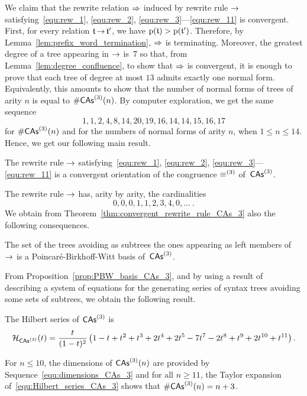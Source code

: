 \noindent
We claim that the rewrite relation $\operatorname{\Rightarrow}$ induced by
rewrite rule $\operatorname{\to}$ satisfying~\eqref{equ:rew_1}, \eqref{equ:rew_2},
\eqref{equ:rew_3}---\eqref{equ:rew_11} is convergent. First, for every
relation $\mathfrak{t} \operatorname{\to} \mathfrak{t}'$, we have
$\mathrm{p}(\mathfrak{t}) > \mathrm{p}(\mathfrak{t}')$. Therefore, by
Lemma~\ref{lem:prefix_word_termination}, $\operatorname{\Rightarrow}$ is terminating.
Moreover, the greatest degree of a tree appearing in $\operatorname{\to}$ is~$7$ so
that, from Lemma~\ref{lem:degree_confluence}, to show that $\operatorname{\Rightarrow}$
is convergent, it is enough to prove that each tree of degree at most
$13$ admits exactly one normal form. Equivalently, this amounts to
show that the number of normal forms of trees of arity $n$ is equal
to $\#\mathsf{CAs}^{(3)}(n)$. By computer exploration, we get the same sequence
\begin{equation} \label{equ:dimensions_CAs_3}
    1, 1, 2, 4, 8, 14, 20, 19, 16, 14, 14, 15, 16, 17
\end{equation}
for $\#\mathsf{CAs}^{(3)}(n)$ and for the numbers of normal forms of arity $n$,
when $ 1 \leq n \leq 14$. Hence, we get our following main result.
\medbreak

\begin{Theorem} \label{thm:convergent_rewrite_rule_CAs_3}
    The rewrite rule $\operatorname{\to}$ satisfying~\eqref{equ:rew_1},
    \eqref{equ:rew_2}, \eqref{equ:rew_3}---\eqref{equ:rew_11} is a
    convergent orientation of the congruence $\operatorname{\equiv}^{(3)}$
    of~$\mathsf{CAs}^{(3)}$.
\end{Theorem}
\medbreak

The rewrite rule $\operatorname{\to}$ has, arity by arity, the cardinalities
\begin{equation}
    0, 0, 0, 1, 1, 2, 3, 4, 0, \dots~.
\end{equation}
We obtain from Theorem~\ref{thm:convergent_rewrite_rule_CAs_3} also
the following consequences.
\medbreak

\begin{Proposition} \label{prop:PBW_basis_CAs_3}
    The set of the trees avoiding as subtrees the ones appearing as
    left members of $\operatorname{\to}$ is a Poincaré-Birkhoff-Witt basis
    of~$\mathsf{CAs}^{(3)}$.
\end{Proposition}
\medbreak

From Proposition~\ref{prop:PBW_basis_CAs_3}, and by using a result
of~\cite{Gir18} describing a system of equations for the generating
series of syntax trees avoiding some sets of subtrees, we obtain the
following result.
\medbreak

\begin{Proposition} \label{prop:Hilbert_series_CAs_3}
    The Hilbert series of $\mathsf{CAs}^{(3)}$ is
    \begin{equation} \label{equ:Hilbert_series_CAs_3}
        \mathcal{H}_{\mathsf{CAs}^{(3)}}(t) = \frac{t}{(1 - t)^2}
        \left(1 - t + t^2 + t^3 + 2t^4 + 2t^5 - 7t^7 - 2t^8 + t^9 +
        2t^{10} + t^{11}\right).
    \end{equation}
\end{Proposition}
\medbreak

For $n \leq 10$, the dimensions of $\mathsf{CAs}^{(3)}(n)$ are provided by
Sequence~\eqref{equ:dimensions_CAs_3} and for all $n \geq 11$, the
Taylor expansion of~\eqref{equ:Hilbert_series_CAs_3} shows that
$\# \mathsf{CAs}^{(3)}(n) = n + 3$.
\medbreak
